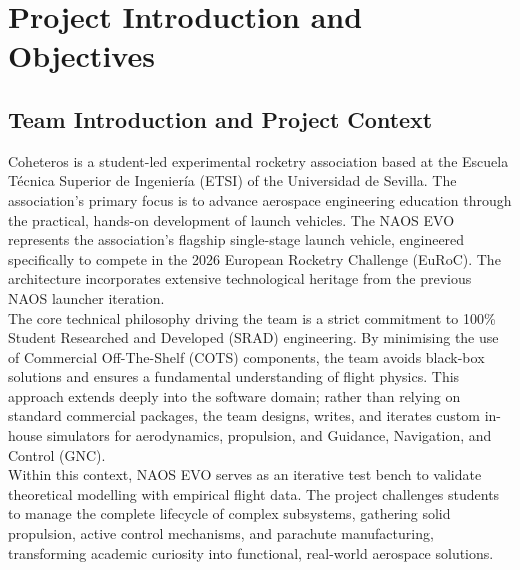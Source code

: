 \documentclass[11pt,a4paper]{article}
\begin{document}

\tableofcontents
\newpage

\listoffigures
\newpage
\listoftables
\newpage

\section{Project Introduction and Objectives}

\subsection{Team Introduction and Project Context}

Coheteros is a student-led experimental rocketry association based at the Escuela Técnica Superior de Ingeniería (ETSI) of the Universidad de Sevilla. The association's primary focus is to advance aerospace engineering education through the practical, hands-on development of launch vehicles. The NAOS EVO represents the association's flagship single-stage launch vehicle, engineered specifically to compete in the 2026 European Rocketry Challenge (EuRoC). The architecture incorporates extensive technological heritage from the previous NAOS launcher iteration.\\

The core technical philosophy driving the team is a strict commitment to 100\% Student Researched and Developed (SRAD) engineering. By minimising the use of Commercial Off-The-Shelf (COTS) components, the team avoids black-box solutions and ensures a fundamental understanding of flight physics. This approach extends deeply into the software domain; rather than relying on standard commercial packages, the team designs, writes, and iterates custom in-house simulators for aerodynamics, propulsion, and Guidance, Navigation, and Control (GNC). \\

Within this context, NAOS EVO serves as an iterative test bench to validate theoretical modelling with empirical flight data. The project challenges students to manage the complete lifecycle of complex subsystems, gathering solid propulsion, active control mechanisms, and parachute manufacturing, transforming academic curiosity into functional, real-world aerospace solutions.
\end{document}
